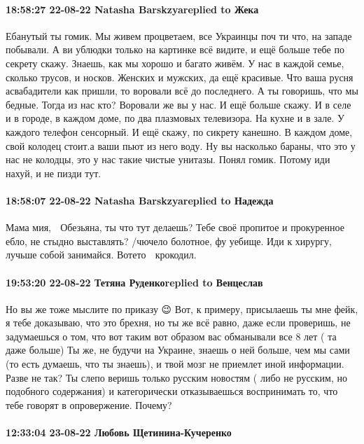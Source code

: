 \paragraph{18:58:27 22-08-22 Natasha Barskzyareplied to Жека}

Ебанутый ты гомик. Мы живем процветаем, все Украинцы поч ти что, на западе побывали. А ви ублюдки только на картинке всё видите, и ещё больше тебе по секрету скажу. Знаешь, как мы хорошо и багато живём. У нас в каждой семье, сколько трусов, и носков. Женских и мужских, да ещё красивые. Что ваша русня асвабадители как пришли, то воровали всё до последнего. А ты говоришь, что мы бедные. Тогда из нас кто? Воровали же вы у нас. И ещё больше скажу. И в селе и в городе, в каждом доме, по два плазмовых телевизора. На кухне и в зале. У каждого телефон сенсорный. И ещё скажу, по сикрету канешно. В каждом доме, свой колодец стоит.а ваши пьют из него воду. Ну вы насколько бараны, что это у нас не колодцы, это у нас такие чистые унитазы. Понял гомик. Потому иди нахуй, и не пизди тут.

\paragraph{18:58:07 22-08-22 Natasha Barskzyareplied to Надежда}

Мама мия, 🙊 Обезьяна, ты что тут делаешь? Тебе своё пропитое и прокуренное
ебло, не стыдно выставлять? /чючело болотное, фу уебище. Иди к хирургу, лучьше
собой занимайся. Вотето 🐊 крокодил.


\paragraph{19:53:20 22-08-22 Тетяна Руденкоreplied to Венцеслав}

Но вы же тоже мыслите по приказу 😉
Вот, к примеру, присылаешь ты мне фейк, я тебе доказываю, что это брехня, но ты же всё равно, даже если проверишь, не задумаешься о том, что вот таким вот образом вас обманывали все 8 лет ( та даже больше) Ты же, не будучи на Украине, знаешь о ней больше, чем мы сами (то есть думаешь, что ты знаешь), и твой мозг не приемлет иной информации. Разве не так? Ты слепо веришь только русским новостям ( либо не русским, но подобного содержания) и категорически отказываешься воспринимать то, что тебе говорят в опровержение. Почему?

\paragraph{12:33:04 23-08-22 Любовь Щетинина-Кучеренко}

